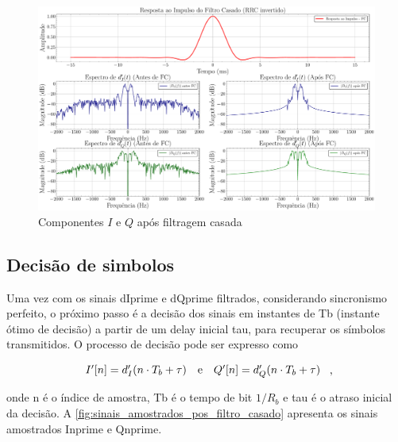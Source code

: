 \begin{figure}[H]
	\centering
	\caption{Componentes $I$ e $Q$ após filtragem casada}\label{fig:espectros_filtro_casado}
	\includegraphics[width=\linewidth]{assets/espectros_filtro_casado.pdf}
\end{figure}


\subsection{Decisão de simbolos}

Uma vez com os sinais \gls{dIprime} e \gls{dQprime} filtrados, considerando sincronismo perfeito, o próximo passo é a decisão dos sinais em instantes de \gls{Tb} (instante ótimo de decisão) a partir de um delay inicial \gls{tau}, para recuperar os símbolos transmitidos. O processo de decisão pode ser expresso como

\vspace{-1em}
\begin{equation}
    \begin{array}{c@{\quad\text{e}\quad}c}
        I'[n] = d'_I(n \cdot T_b + \tau) & Q'[n] = d'_Q(n \cdot T_b + \tau)
    \end{array} \text{ ,}
\end{equation}

\noindent onde \gls{n} é o índice de amostra, \gls{Tb} é o tempo de bit $1/R_b$ e \gls{tau} é o atraso inicial da decisão. A \autoref{fig:sinais_amostrados_pos_filtro_casado} apresenta os sinais amostrados \gls{Inprime} e \gls{Qnprime}. 

